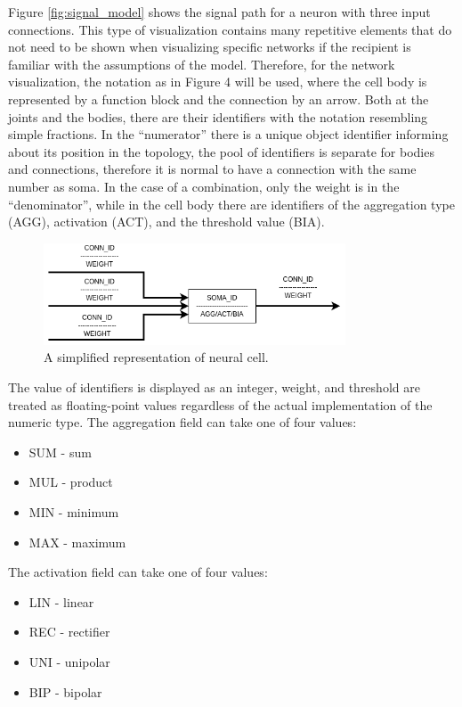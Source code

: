 Figure \ref{fig:signal_model} shows the signal path for a neuron with three input connections. 
This type of visualization contains many repetitive elements that do not need to be shown 
when visualizing specific networks if the recipient is familiar with the assumptions 
of the model. 
Therefore, for the network visualization, the notation as in Figure 4 will be used, 
where the cell body is represented by a function block and the connection by an arrow. 
Both at the joints and the bodies, there are their identifiers with the notation 
resembling simple fractions. In the ``numerator'' there is a unique object 
identifier informing about its position in the topology, the pool of identifiers 
is separate for bodies and connections, therefore it is normal to have a connection 
with the same number as soma. In the case of a combination, only the weight is in the 
``denominator'', while in the cell body there are identifiers of the aggregation type 
(AGG), activation (ACT), and the threshold value (BIA).
\begin{figure}[htb] 
	\centering
	\includegraphics[width=0.8\textwidth]{figures/simple_mode}
	\caption{A simplified representation of neural cell.}
	\label{fig:simple_mode}
\end{figure}


The value of identifiers is displayed as an integer, weight, and threshold are treated 
as floating-point values regardless of the actual implementation of the numeric type. 
The aggregation field can take one of four values:  
\begin{itemize}
	\item SUM - sum 
	\item MUL - product 
	\item MIN - minimum 
	\item MAX - maximum 
\end{itemize}
The activation field can take one of four values:
\begin{itemize}
	\item LIN - linear
	\item REC - rectifier
	\item UNI - unipolar
	\item BIP - bipolar
\end{itemize}


